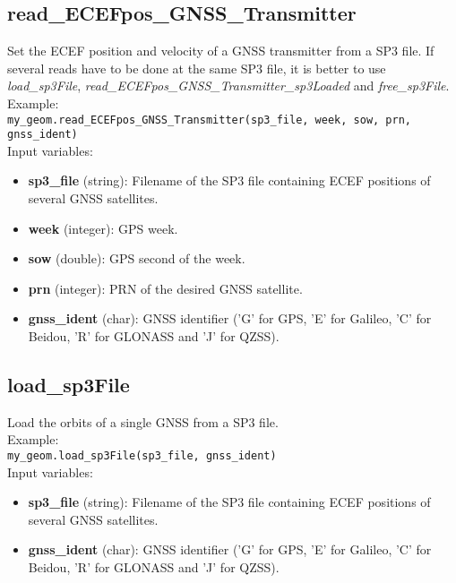 \subsection{read\_ECEFpos\_GNSS\_Transmitter}

Set the ECEF position and velocity of a GNSS transmitter from a SP3 file. If several reads have to be done at the same SP3 file, it is better to use {\it load\_sp3File}, {\it read\_ECEFpos\_GNSS\_Transmitter\_sp3Loaded} and {\it free\_sp3File}.\\

Example:\\

\texttt{my\_geom.read\_ECEFpos\_GNSS\_Transmitter(sp3\_file, week, sow, prn, gnss\_ident)}\\

Input variables:
\begin{itemize}
\item {\bf sp3\_file} (string): Filename of the SP3 file containing ECEF positions of several GNSS satellites.
\item {\bf week} (integer): GPS week.
\item {\bf sow} (double): GPS second of the week.
\item {\bf prn} (integer): PRN of the desired GNSS satellite.
\item {\bf gnss\_ident} (char): GNSS identifier ('G' for GPS, 'E' for Galileo, 'C' for Beidou, 'R' for GLONASS and 'J' for QZSS).
\end{itemize}


\subsection{load\_sp3File}

Load the orbits of a single GNSS from a SP3 file.\\

Example:\\

\texttt{my\_geom.load\_sp3File(sp3\_file, gnss\_ident)}\\

Input variables:
\begin{itemize}
\item {\bf sp3\_file} (string): Filename of the SP3 file containing ECEF positions of several GNSS satellites.
\item {\bf gnss\_ident} (char): GNSS identifier ('G' for GPS, 'E' for Galileo, 'C' for Beidou, 'R' for GLONASS and 'J' for QZSS).
\end{itemize}


